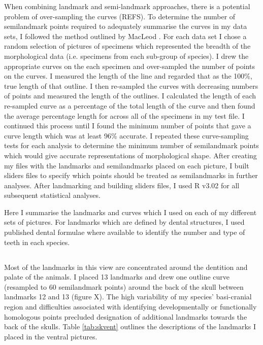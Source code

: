 When combining landmark and semi-landmark approaches, there is a potential problem of over-sampling the curves (REFS). To determine the number of semilandmark points required to adequately summarise the curves in my data sets,  I followed the method outlined by MacLeod \citeyearpar{MacLeod2012}. For each data set I chose a random selection of pictures of specimens which represented the breadth of the morphological data (i.e. specimens from each sub-group of species).  I drew the appropriate curves on the each specimen and over-sampled the number of points on the curves. I measured the length of the line and regarded that as the 100\%, true length of that outline. I then re-sampled the curves with decreasing numbers of points and measured the length of the outlines. I calculated the length of each re-sampled curve as a percentage of the total length of the curve and then found the average percentage length for across all of the specimens in my test file. I continued this process until I found the minimum number of points that gave a curve length which was at least 96\% accurate.  I repeated these curve-sampling tests for each analysis to determine the minimum number of semilandmark points which would give accurate representations of morphological shape.
After creating my files with the landmarks and semilandmarks placed on each picture, I built sliders files \citep{Zelditch2012} to specify which points should be treated as semilandmarks in further analyses. After landmarking and building sliders files, I used R v3.02 \citep[R Development Core][]{Team2013} for all subsequent statistical analyses.

Here I summarise the landmarks and curves which I used on each of my different sets of pictures. For landmarks which are defined by dental structures, I used published dental formulae \citep{Nowak1983, MacPhee1987, KnoxJones1992, Marshall1996, Nagorsen2002, Goodman2006, Asher2008, ADW2013} where available to identify the number and type of teeth in each species.

\subsection{}

Most of the landmarks in this view are concentrated around the dentition and palate of the animals. I placed 13 landmarks and drew one outline curve (resampled to 60 semilandmark points) around the back of the skull between landmarks 12 and 13 (figure X). The high variability of my species’ basi-cranial region and difficulties associated with identifying developmentally or functionally homologous points precluded designation of additional landmarks towards the back of the skulls. Table \ref{tab:skvent} outlines the descriptions of the landmarks I placed in the ventral pictures.

